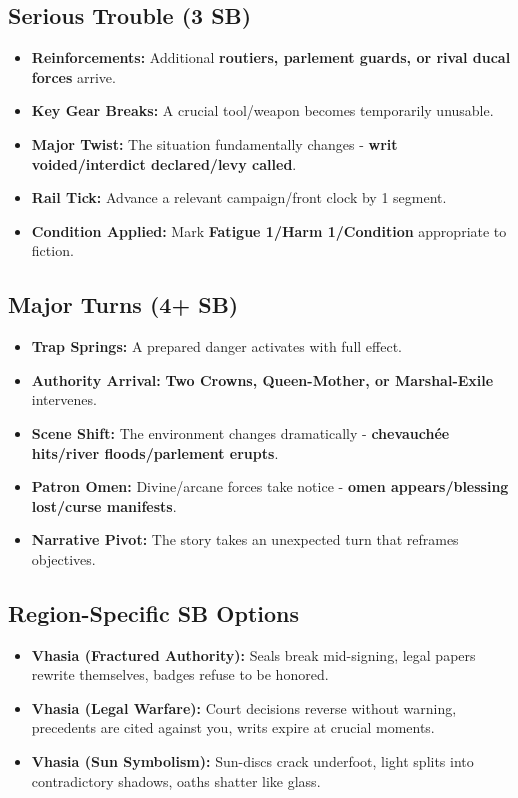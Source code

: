 \subsection*{Serious Trouble (3 SB)}
\begin{itemize}
\item \textbf{Reinforcements:} Additional \textbf{routiers, parlement guards, or rival ducal forces} arrive.
\item \textbf{Key Gear Breaks:} A crucial tool/weapon becomes temporarily unusable.
\item \textbf{Major Twist:} The situation fundamentally changes - \textbf{writ voided/interdict declared/levy called}.
\item \textbf{Rail Tick:} Advance a relevant campaign/front clock by 1 segment.
\item \textbf{Condition Applied:} Mark \textbf{Fatigue 1/Harm 1/Condition} appropriate to fiction.
\end{itemize}

\subsection*{Major Turns (4+ SB)}
\begin{itemize}
\item \textbf{Trap Springs:} A prepared danger activates with full effect.
\item \textbf{Authority Arrival:} \textbf{Two Crowns, Queen-Mother, or Marshal-Exile} intervenes.
\item \textbf{Scene Shift:} The environment changes dramatically - \textbf{chevauchée hits/river floods/parlement erupts}.
\item \textbf{Patron Omen:} Divine/arcane forces take notice - \textbf{omen appears/blessing lost/curse manifests}.
\item \textbf{Narrative Pivot:} The story takes an unexpected turn that reframes objectives.
\end{itemize}

\subsection*{Region-Specific SB Options}
\begin{itemize}
\item \textbf{Vhasia (Fractured Authority):} Seals break mid-signing, legal papers rewrite themselves, badges refuse to be honored.
\item \textbf{Vhasia (Legal Warfare):} Court decisions reverse without warning, precedents are cited against you, writs expire at crucial moments.
\item \textbf{Vhasia (Sun Symbolism):} Sun-discs crack underfoot, light splits into contradictory shadows, oaths shatter like glass.
\end{itemize}
